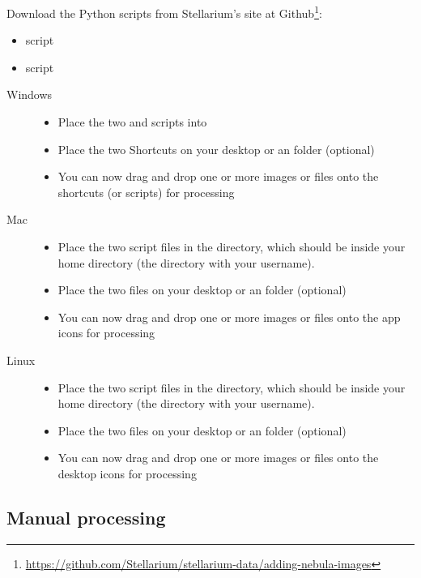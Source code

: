 Download the Python scripts from Stellarium's site at Github\footnote{\url{https://github.com/Stellarium/stellarium-data/adding-nebula-images}}:
\begin{itemize}
\item {} script
\item {} script
\end{itemize}
\begin{description}
\item[Windows]\mbox{}
  \begin{itemize}
  \item Place the two  and  scripts into 
  \item Place the two Shortcuts on your desktop or an  folder (optional)
  \item You can now drag and drop one or more images or  files onto the shortcuts (or  scripts) for processing
  \end{itemize}
\item[Mac]\mbox{}
  \begin{itemize}
  \item Place the two  script files in the  directory, which should be inside your home directory (the directory with your username).
  \item Place the two  files on your desktop or an  folder (optional)
  \item You can now drag and drop one or more images or  files onto the  app icons for processing
  \end{itemize}
\item[Linux]\mbox{}
  \begin{itemize}
  \item Place the two  script files in the  directory, which should be inside your home directory (the directory with your username).
  \item Place the two  files on your desktop or an  folder (optional)
  \item You can now drag and drop one or more images or  files onto the desktop icons for processing
  \end{itemize}
\end{description}

\subsection{Manual processing}
\label{sec:dso:adding_images:manual}

